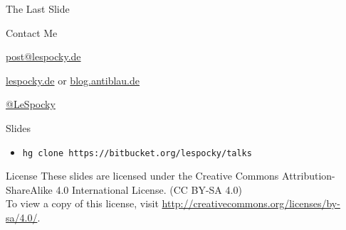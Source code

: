 \documentclass[t]{beamer}
\begin{document}
\begin{frame}{The Last Slide}
    \begin{block}{Contact Me}
        \begin{description}[Twitter]
            \item [E-Mail] \href{mailto:post@lespocky.de}{post@lespocky.de}
            \item [WWW] \href{http://www.lespocky.de/}{lespocky.de} or
                    \href{http://blog.antiblau.de/}{blog.antiblau.de}
            \item [Twitter] \href{https://twitter.com/LeSpocky}{@LeSpocky}
        \end{description}
    \end{block}
    \begin{block}{Slides}
        \begin{itemize}
            \item \texttt{hg clone https://bitbucket.org/lespocky/talks}
        \end{itemize}
    \end{block}
    \begin{block}{License}
        These slides are licensed under the Creative Commons
        Attribution-ShareAlike 4.0 International License. (CC BY-SA 4.0) \\
        To view a copy of this license, visit
        \url{http://creativecommons.org/licenses/by-sa/4.0/}.
    \end{block}
\end{frame}
\end{document}
